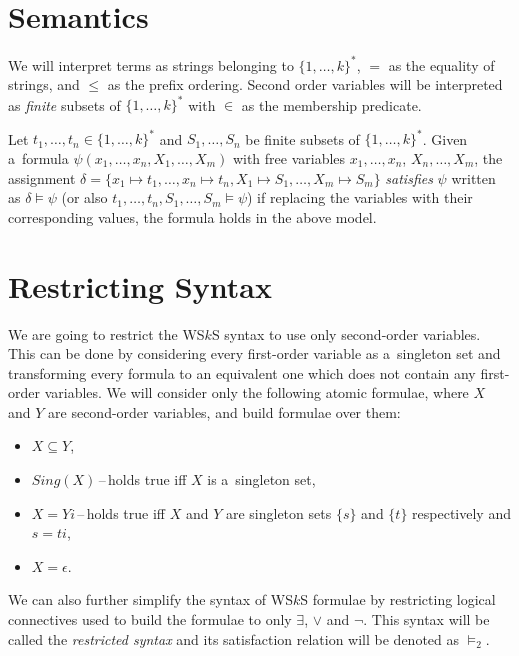   \section{Semantics}
	
We will interpret terms as strings belonging to $\{1,\ldots,k\}^*$, $=$ as the
equality of strings, and $\leq$ as the prefix ordering. Second order variables
will be interpreted as \emph{finite} subsets of $\{1,\ldots,k\}^*$ with
$\in$ as the membership predicate.
	
Let $t_1,\ldots,t_n \in \{1,\ldots,k\}^*$ and $S_1,\ldots,S_n$ be finite subsets
of $\{1,\ldots,k\}^*$. Given a~formula $\psi(x_1,\ldots,x_n,X_1,\ldots,X_m)$
with free variables $x_1,\ldots,x_n$, $X_n,\ldots,X_m$, the assignment $\delta =
\{ x_1 \mapsto t_1,\ldots, x_n \mapsto t_n, X_1 \mapsto S_1,\ldots, X_m \mapsto
S_m\}$ \emph{satisfies} $\psi$ written as $\delta \models \psi$ (or also
$t_1,\ldots, t_n, S_1,\ldots,S_m \models \psi$) if replacing the variables with
their corresponding values, the formula holds in the above model.
	
  \section{Restricting Syntax}\label{restricted}
	We are going to restrict the WS$k$S syntax to use only second-order variables.
	This can be done by considering every first-order variable as a~singleton set
	and transforming every formula to an equivalent one which does not contain any
	first-order variables. We will consider only the following atomic formulae,
	where $X$ and $Y$ are second-order variables, and build formulae over them:
	\begin{itemize}
	 \item $X \subseteq Y$,
\item $\mathit{Sing}(X)$\,--\,holds true iff $X$ is a~singleton set, \item $X
= Yi$\,--\,holds true iff $X$ and $Y$ are singleton sets $\{s\}$ and $\{t\}$
respectively and $s = ti$,
	 \item $X = \epsilon$.
	\end{itemize}
	
We can also further simplify the syntax of WS$k$S formulae by restricting
logical connectives used to build the formulae to only $\exists$, $\vee$ and
$\neg$. This syntax will be called
the \emph{restricted syntax} and its satisfaction relation will be denoted as
$\models_2$.
	
